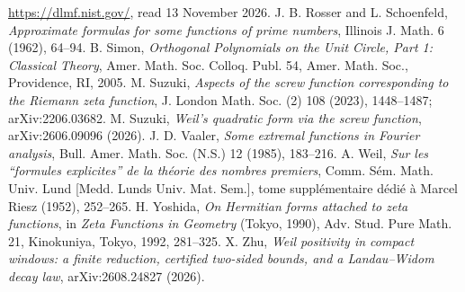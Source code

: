   \url{https://dlmf.nist.gov/}, read 13 November 2026.
 J. B. Rosser and L. Schoenfeld, \emph{Approximate formulas for some functions of prime
  numbers}, Illinois J. Math. 6 (1962), 64--94.
 B. Simon, \emph{Orthogonal Polynomials on the Unit Circle, Part 1: Classical Theory}, Amer. Math.
  Soc. Colloq. Publ. 54, Amer. Math. Soc., Providence, RI, 2005.
 M. Suzuki, \emph{Aspects of the screw function corresponding to the Riemann zeta function}, J.
  London Math. Soc. (2) 108 (2023), 1448--1487; arXiv:2206.03682.
 M. Suzuki, \emph{Weil's quadratic form via the screw function}, arXiv:2606.09096 (2026).
 J. D. Vaaler, \emph{Some extremal functions in Fourier analysis}, Bull. Amer. Math. Soc. (N.S.) 12
  (1985), 183--216.
 A. Weil, \emph{Sur les ``formules explicites'' de la th\'eorie des nombres premiers}, Comm. S\'em.
  Math. Univ. Lund [Medd. Lunds Univ. Mat. Sem.], tome suppl\'ementaire d\'edi\'e \`a Marcel Riesz (1952), 252--265.
 H. Yoshida, \emph{On Hermitian forms attached to zeta functions}, in \emph{Zeta Functions in
  Geometry} (Tokyo, 1990), Adv. Stud. Pure Math. 21, Kinokuniya, Tokyo, 1992, 281--325.
 X. Zhu, \emph{Weil positivity in compact windows: a finite reduction, certified two-sided bounds, and a
  Landau--Widom decay law}, arXiv:2608.24827 (2026).
